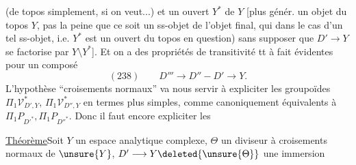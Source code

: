 (de topos simplement, si on veut...) et un ouvert $Y^{*}$ de $Y$ [plus génér. un objet du topos  $Y$, pas la peine  que ce soit un ss-objet de l'objet final, qui dans le cas d'un tel ss-objet, i.e.  $Y^{*}$ est un ouvert du topos en question) sans supposer que $D'\to Y$ se factorise par $Y\setminus Y^{*}$]. Et on a des propriétés de transitivité tt à fait évidentes pour un composé
\[
(238)\qquad D'''\longrightarrow D''\mathbin{-}D'\longrightarrow Y.
\]
L'hypothèse ``croisements normaux'' va nous servir à expliciter les groupoïdes $\Pi_1\mathcal V^{*}_{D',Y}$, $\Pi_1\mathcal V^{*}_{D'',Y}$ en termes plus simples, comme canoniquement équivalents à $\Pi_1P_{D'^{*}},\Pi_1P_{D''^{*}}$. Donc il faut encore expliciter les 

\uline{Théorème}\quad Soit $Y$ un espace analytique complexe, $\Theta$ un diviseur à croisements normaux de $\unsure{Y}$, $D'\longrightarrow Y\deleted{\unsure{\Theta}}$ une immersion
